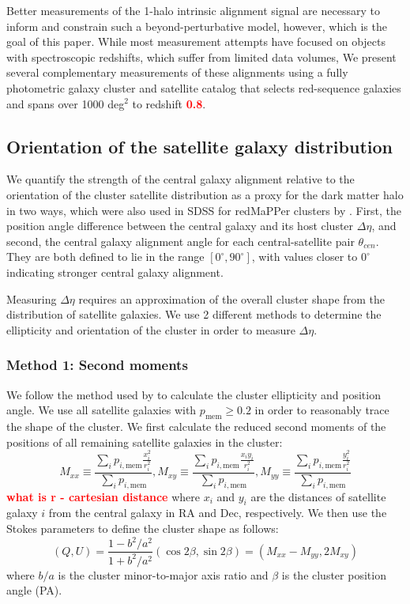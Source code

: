 \documentclass[fleqn,usenatbib]{mnras}
\newcommand{\verify}[1]{\textcolor{red}{\textbf{{#1}}}}
\newcommand{\degree}{^{\circ}}
\begin{document}
Better measurements of the 1-halo intrinsic alignment signal are necessary to inform and constrain such a beyond-perturbative model, however, which is the goal of this paper. While most measurement attempts have focused on objects with spectroscopic redshifts, which suffer from limited data volumes, We present several complementary measurements of these alignments using a fully photometric galaxy cluster and satellite catalog that selects red-sequence galaxies and spans over 1000 deg$^2$ to redshift \verify{0.8}. 

\subsection{Orientation of the satellite galaxy distribution}\label{pamethod}

We quantify the strength of the central galaxy alignment relative to the orientation of the cluster satellite distribution as a proxy for the dark matter halo in two ways, which were also used in SDSS for redMaPPer clusters by \cite{Huang_2016}. First, the position angle difference between the central galaxy and its host cluster $\Delta \eta$, and second, the central galaxy alignment angle for each central-satellite pair $\theta _{cen}$. They are both defined to lie in the range $[0 \degree , 90 \degree]$, with values closer to $0 \degree$ indicating stronger central galaxy alignment.

Measuring $\Delta \eta$ requires an approximation of the overall cluster shape from the distribution of satellite galaxies. We use 2 different methods to determine the ellipticity and orientation of the cluster in order to measure $\Delta \eta$.

\subsubsection{Method 1: Second moments}

We follow the method used by \citet{Huang_2016} to calculate the cluster ellipticity and position angle. We use all satellite galaxies with $p_{\mathrm{mem}} \geq 0.2$ in order to reasonably trace the shape of the cluster. We first calculate the reduced second moments of the positions of all remaining satellite galaxies in the cluster:
\begin{equation}
    M_{xx} \equiv \frac{\sum_i p_{i,\mathrm{mem}} \frac{x_i^2}{r_i^2}}{\sum_i p_{i,\mathrm{mem}}}, M_{xy} \equiv \frac{\sum_i p_{i,\mathrm{mem}} \frac{x_i y_i}{r_i^2}}{\sum_i p_{i,\mathrm{mem}}}, M_{yy} \equiv \frac{\sum_i p_{i,\mathrm{mem}} \frac{y_i^2}{r_i^2}}{\sum_i p_{i,\mathrm{mem}}}
\end{equation}
\verify{what is r - cartesian distance}
where $x_i$ and $y_i$ are the distances of satellite galaxy $i$ from the central galaxy in RA and Dec, respectively. We then use the Stokes parameters to define the cluster shape as follows:
\begin{equation}
    (Q, U) = \frac{1-b^2/a^2}{1+b^2/a^2} (\cos 2\beta, \sin 2\beta) = (M_{xx} - M_{yy}, 2M_{xy})
\end{equation}
where $b/a$ is the cluster minor-to-major axis ratio and $\beta$ is the cluster position angle (PA).
\end{document}
